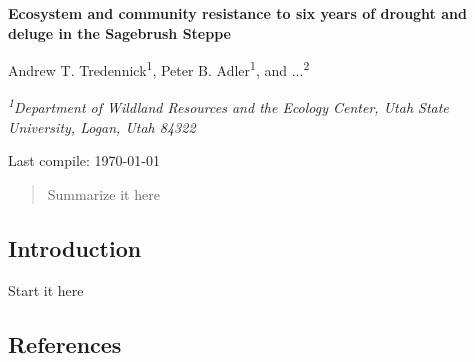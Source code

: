 \documentclass[12pt,]{article}
\title{}
\author{}
\date{}
\begin{document}
\renewcommand\linenumberfont{\normalfont\tiny\sffamily\color{gray}}

 \newcommand{\new}{\textcolor{blue}}

\begin{singlespace}

\begin{centering}

\Large{\textbf{Ecosystem and community resistance to six years of drought and deluge in the Sagebrush Steppe}}

\bigskip{} \bigskip{}

\renewcommand*{\thefootnote}{\fnsymbol{footnote}}

\normalsize{Andrew T. Tredennick\textsuperscript{1}, Peter B. Adler\textsuperscript{1}, and ...\textsuperscript{2}}

\bigskip{}

\textit{\small{\textsuperscript{1}Department of Wildland Resources and the Ecology Center, Utah State University, Logan, Utah 84322}} 

\end{centering}

\vspace{3em}

Last compile: \today

\end{singlespace}

\newpage{}

\begin{abstract}
Summarize it here
\vspace{2em}
\end{abstract}

\setlength{\parindent}{5ex}

\subsection{Introduction}\label{introduction}

Start it here

\subsection{References}\label{references}
\end{document}
